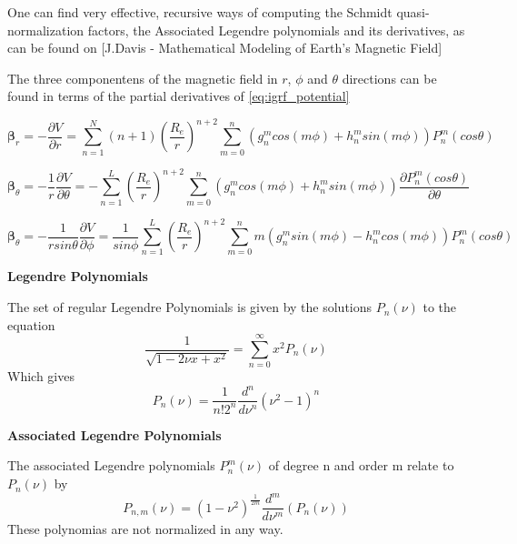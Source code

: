 One can find very effective, recursive ways of computing the Schmidt quasi-normalization factors, the Associated Legendre polynomials and its derivatives, as can be found on [J.Davis - Mathematical Modeling of Earth’s Magnetic Field] %

The three componentens of the magnetic field in $r$, $\phi$ and $\theta$ directions can be found in terms of the partial derivatives of \ref{eq:igrf_potential}

\begin{equation}
{\bm \beta}_r = -\dfrac{\partial V}{\partial r} = \sum_{n=1}^{N} (n+1) \left(\dfrac{R_e}{r}\right)^{n+2} \sum_{m=0}^{n} \left(g_n^m cos(m\phi) + h_n^m sin(m\phi)\right) P_n^m(cos\theta)
\end{equation}

\begin{equation}
{\bm \beta}_{\theta} = -\dfrac{1}{r} \dfrac{\partial V}{\partial \theta} = 
-\sum_{n=1}^{L} \left(\dfrac{R_e}{r}\right)^{n+2} \sum_{m=0}^{n} \left(g_n^m cos(m\phi) + h_n^m sin(m\phi)\right) \dfrac{\partial P_n^m(cos\theta)}{\partial \theta}
\end{equation}

\begin{equation}
{\bm \beta}_{\theta} = -\dfrac{1}{r sin\theta} \dfrac{\partial V}{\partial \phi} = 
\dfrac{1}{sin\phi}\sum_{n=1}^{L} \left(\dfrac{R_e}{r}\right)^{n+2} \sum_{m=0}^{n} m\left(g_n^m sin(m\phi) - h_n^m cos(m\phi)\right) P_n^m(cos\theta)
\end{equation}

{\bf Legendre Polynomials}

The set of regular Legendre Polynomials is given by the solutions $P_n(\nu)$ to the equation
\begin{equation}
\dfrac{1}{\sqrt{1-2\nu x + x^2}} = \sum_{n=0}^\infty x^2 P_n(\nu)
\end{equation}
Which gives
\begin{equation}
P_n(\nu) = \dfrac{1}{n! 2^n} \dfrac{d^n}{d\nu^n} (\nu^2 -1)^n
\end{equation}

{\bf Associated Legendre Polynomials}

The associated Legendre polynomials $P_n^m(\nu)$ of degree n and order m relate to $P_n(\nu)$ by
\begin{equation}
P_{n,m}(\nu) = (1-\nu^2)^{\frac{1}{2m}} \dfrac{d^m}{d\nu^m}(P_n(\nu))
\end{equation}
These polynomias are not normalized in any way. 

